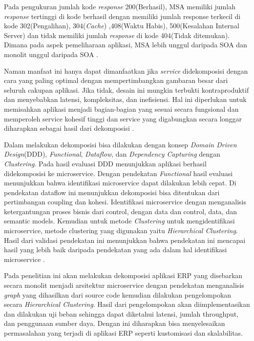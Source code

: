 Pada pengukuran jumlah kode \textit{response} 200(Berhasil), MSA memiliki jumlah \textit{response} tertinggi di kode berhasil dengan memiliki jumlah response terkecil di kode 302(Pengalihan), 304(\textit{Cache}) ,408(Waktu Habis), 500(Kesalahan Internal Server) dan tidak memiliki jumlah \textit{response} di kode 404(Tidak ditemukan). Dimana pada aspek pemeliharaan aplikasi, MSA lebih unggul daripada SOA dan monolit unggul daripada SOA \cite{5FA}.

Naman manfaat ini hanya dapat dimanfaatkan jika \textit{service} didekomposisi dengan cara yang paling optimal dengan mempertimbangkan gambaran besar dari seluruh cakupan aplikasi. Jika tidak, desain ini mungkin terbukti kontraproduktif dan menyebabkan latensi, kompleksitas, dan inefisiensi. Hal ini diperlukan untuk memisahkan aplikasi menjadi bagian-bagian yang sesuai secara fungsional dan memperoleh service kohesif tinggi dan service yang digabungkan secara longgar diharapkan sebagai hasil dari dekomposisi \cite{6C1}.

Dalam melakukan dekomposisi bisa dilakukan dengan konsep \textit{Domain Driven Design}(DDD), \textit{Functional}, \textit{Dataflow}, dan \textit{Dependency Capturing} dengan \textit{Clustering}. Pada hasil evaluasi DDD menunjukkan aplikasi berhasil didekomposisi ke microservice. Dengan pendekatan \textit{Functional} hasil evaluasi menunjukkan bahwa identifikasi microservice dapat dilakukan lebih cepat. Di pendekatan dataflow ini menunjukkan dekomposisi bisa ditentukan dari pertimbangan coupling dan kohesi. Identifikasi microservice dengan menganalisis ketergantungan proses bisnis dari control, dengan data dan control, data, dan semantic models. Kemudian untuk metode \textit{Clustering} untuk mengidentifikasi microservice, metode clustering yang digunakan yaitu \textit{Hierarchical Clustering}. Hasil dari validasi pendekatan ini menunjukkan bahwa pendekatan ini mencapai hasil yang lebih baik daripada pendekatan yang ada dalam hal identifikasi microservice \cite{FC3}.

Pada penelitian ini akan melakukan dekomposisi aplikasi ERP yang disebarkan secara monolit menjadi arsitektur microservice dengan pendekatan menganalisis \textit{graph} yang dihasilkan dari source code kemudian dilakukan pengelompokan secara \textit{Hierarchical Clustering}. Hasil dari pengelompokan akan diimplementasikan dan dilakukan uji beban sehingga dapat diketahui latensi, jumlah throughput, dan penggunaan sumber daya. Dengan ini diharapkan bisa menyelesaikan permasalahan yang terjadi di aplikasi ERP seperti kustomisasi dan skalabilitas.

